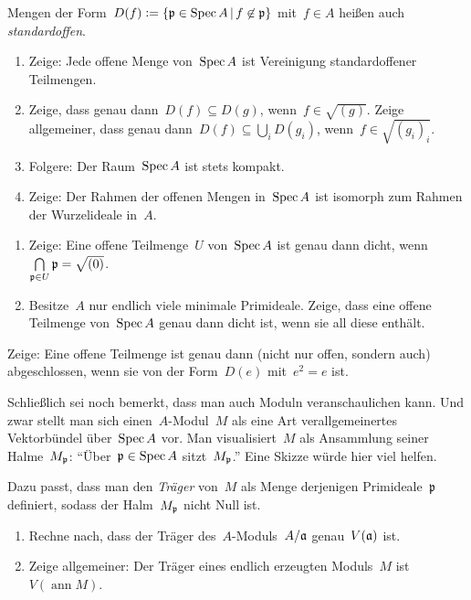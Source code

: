 \documentclass{uebblatt}
\begin{document}
\begin{fun}Mengen der Form~$D(f) \vcentcolon= \{ \mathfrak{p} \in \operatorname{Spec} A \,|\, f \not\in
\mathfrak{p} \}$ mit~$f \in A$ heißen auch \emph{standardoffen}.
\begin{enumerate}
\item Zeige: Jede offene Menge von~$\operatorname{Spec} A$ ist Vereinigung
standardoffener Teilmengen.
\item Zeige, dass genau dann~$D(f) \subseteq D(g)$, wenn~$f \in
\sqrt{(g)}$. Zeige allgemeiner, dass genau dann~$D(f) \subseteq \bigcup_i
D(g_i)$, wenn~$f \in \sqrt{(g_i)_i}$.
\item Folgere: Der Raum~$\operatorname{Spec} A$ ist stets kompakt.
\item Zeige: Der Rahmen der offenen Mengen in~$\operatorname{Spec} A$ ist isomorph zum Rahmen
der Wurzelideale in~$A$.
\end{enumerate}
\end{fun}

\begin{fun}\begin{enumerate}
\item Zeige: Eine offene Teilmenge~$U$ von~$\operatorname{Spec} A$ ist genau dann dicht,
wenn~$\bigcap\limits_{\mathfrak{p} \in U} \mathfrak{p} = \sqrt{(0)}$.
\item Besitze~$A$ nur endlich viele minimale Primideale. Zeige, dass eine
offene Teilmenge von~$\operatorname{Spec} A$ genau dann dicht ist, wenn sie all diese
enthält.\end{enumerate}\end{fun}

\begin{fun}Zeige: Eine offene Teilmenge ist genau dann (nicht nur offen,
sondern auch) abgeschlossen, wenn sie von der Form~$D(e)$ mit~$e^2 = e$
ist.\end{fun}

Schließlich sei noch bemerkt, dass man auch Moduln veranschaulichen kann. Und
zwar stellt man sich einen~$A$-Modul~$M$ als eine Art verallgemeinertes
Vektorbündel über~$\operatorname{Spec} A$ vor. Man visualisiert~$M$ als Ansammlung seiner
Halme~$M_{\mathfrak{p}}$: "`Über~$\mathfrak{p} \in \operatorname{Spec} A$ sitzt~$M_{\mathfrak{p}}$."' Eine Skizze würde
hier viel helfen.

Dazu passt, dass man den \emph{Träger} von~$M$ als Menge derjenigen
Primideale~$\mathfrak{p}$ definiert, sodass der Halm~$M_{\mathfrak{p}}$ nicht Null ist.

\begin{fun}\begin{enumerate}
\item Rechne nach, dass der Träger des~$A$-Moduls~$A/\mathfrak{a}$ genau~$V(\mathfrak{a})$
ist.
\item Zeige allgemeiner: Der Träger eines endlich erzeugten Moduls~$M$
ist~$V(\operatorname{ann} M)$.\end{enumerate}\end{fun}
\end{document}
